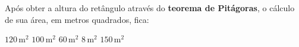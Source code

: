 Após obter a altura do retângulo através do \textbf{teorema de Pitágoras}, o cálculo de sua área, em metros quadrados, fica:

\parbox{0.4\linewidth}{

$120$\,m$^2$
$100$\,m$^2$
$60$\,m$^2$
$8$\,m$^2$
$150$\,m$^2$

}\parbox{0.59\linewidth}{
\begin{center}
\vspace{-6mm}
\vspace{-9mm}
\end{center}
}


